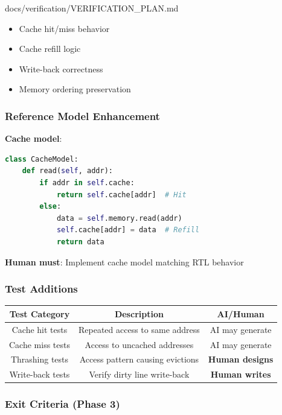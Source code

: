 \begin{relocated}{docs/verification/VERIFICATION_PLAN.md}
\begin{itemize}
\tightlist
\item
  Cache hit/miss behavior
\item
  Cache refill logic
\item
  Write-back correctness
\item
  Memory ordering preservation
\end{itemize}

\subsubsection{Reference Model Enhancement}\label{ds:ch:verification-plan:reference-model-enhancement}

\textbf{Cache model}:

\begin{lstlisting}[language=Python]
class CacheModel:
    def read(self, addr):
        if addr in self.cache:
            return self.cache[addr]  # Hit
        else:
            data = self.memory.read(addr)
            self.cache[addr] = data  # Refill
            return data
\end{lstlisting}

\textbf{Human must}: Implement cache model matching RTL behavior

\subsubsection{Test Additions}\label{ds:ch:verification-plan:test-additions-1}

{
\begin{longtable}[]{@{}ccc@{}}
\toprule\noalign{}
Test Category & Description & AI/Human \\
\midrule\noalign{}
\endhead
\bottomrule\noalign{}
\endlastfoot
Cache hit tests & Repeated access to same address & AI may generate \\
Cache miss tests & Access to uncached addresses & AI may generate \\
Thrashing tests & Access pattern causing evictions & \textbf{Human
designs} \\
Write-back tests & Verify dirty line write-back & \textbf{Human
writes} \\
\end{longtable}
}

\subsubsection{Exit Criteria (Phase 3)}\label{ds:ch:verification-plan:exit-criteria-phase-3}


\end{relocated}

